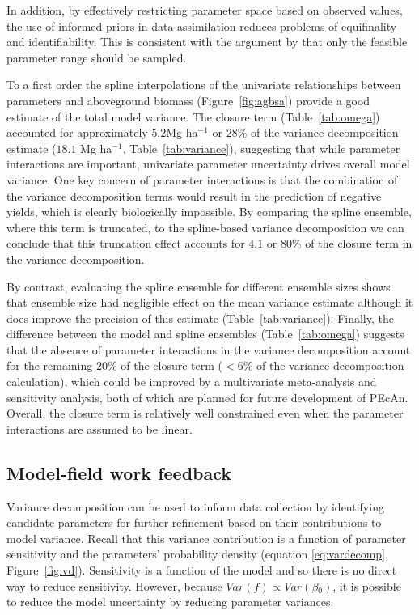 \documentclass[12pt]{article}
\begin{document}
\begin{flushleft}
\begin{spacing}{1.9}
 In addition, by effectively restricting parameter space based on observed values, the use of informed priors in data assimilation reduces problems of equifinality and identifiability. 
 This is consistent with the argument by \citet{beven2001eda} that only the feasible parameter range should be sampled.

 To a first order the spline interpolations of the univariate relationships between parameters and aboveground biomass (Figure~\ref{fig:agbsa}) provide a good estimate of the total model variance. 
 The closure term (Table~\ref{tab:omega}) accounted for approximately $5.2$Mg ha$^{-1}$ or $28\%$ of the variance decomposition estimate ($18.1$ Mg ha$^{-1}$, Table~\ref{tab:variance}), suggesting that while parameter interactions are important, univariate parameter uncertainty drives overall model variance.
 One key concern of parameter interactions is that the combination of the variance decomposition terms would result in the prediction of negative yields, which is clearly biologically impossible.
 By comparing the spline ensemble, where this term is truncated, to the spline-based variance decomposition we can conclude that this truncation effect accounts for $4.1$ or $80\%$ of the closure term in the variance decomposition.

 By contrast, evaluating the spline ensemble for different ensemble sizes shows that ensemble size had negligible effect on the mean variance estimate although it does improve the precision of this estimate (Table~\ref{tab:variance}).
 Finally, the difference between the model and spline ensembles (Table~\ref{tab:omega}) suggests that the absence of parameter interactions in the variance decomposition account for the remaining $20\%$ of the closure term ($<6\%$ of the variance decomposition calculation), which could be improved by a multivariate meta-analysis and sensitivity analysis, both of which are planned for future development of PEcAn.
 Overall, the closure term is relatively well constrained even when the parameter interactions are assumed to be linear.

\subsection*{Model-field work feedback}

 Variance decomposition can be used to inform data collection by identifying candidate parameters for further refinement based on their contributions to model variance.
 Recall that this variance contribution is a function of parameter sensitivity and the parameters' probability density (equation \ref{eq:vardecomp}, Figure~\ref{fig:vd}).
 Sensitivity is a function of the model and so there is no direct way to reduce sensitivity.
 However, because $Var(f)\propto Var(\beta{_0})$, it is possible to reduce the model uncertainty by reducing parameter variances.
   

\end{spacing}
\end{flushleft}
\end{document}
